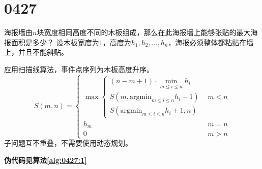\section{0427}\label{sec:0427}
\begin{questions}
    \question 海报墙由$n$块宽度相同高度不同的木板组成，那么在此海报墙上能够张贴的最大海报面积是多少？
    设木板宽度为$1$，高度为$h_1,h_2, \dots ,h_n$，海报必须整体都粘贴在墙上，并且不能斜贴。

    \begin{figure}[H]
        \centering
    \end{figure}

    \begin{solution}
        应用扫描线算法，事件点序列为木板高度升序。
        \[
            S(m,n) = \begin{cases}
                \max \begin{cases}
                    (n-m+1) \cdot \min_{m \le i \le n}{h_i}      \\
                    S(m,\mathrm{argmin}_{m \le i \le n}{h_i} -1) \\
                    S(\mathrm{argmin}_{m \le i \le n}{h_i} + 1, n)
                \end{cases} & m < n \\
                h_m                             & m = n \\
                0                               & m > n
            \end{cases}
        \]
        子问题互不重叠，不需要使用动态规划。

        \textbf{伪代码见算法\ref{alg:0427:1}}
    \end{solution}


\end{questions}
